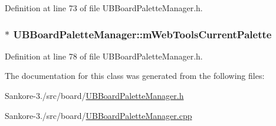 Definition at line 73 of file U\-B\-Board\-Palette\-Manager.\-h.

\hypertarget{class_u_b_board_palette_manager_a2e6478b9eff52e3d2681705a6db41a77}{
\subsubsection[{m\-Web\-Tools\-Current\-Palette}]{$\ast$ U\-B\-Board\-Palette\-Manager\-::m\-Web\-Tools\-Current\-Palette}}\label{dc/d38/class_u_b_board_palette_manager_a2e6478b9eff52e3d2681705a6db41a77}


Definition at line 78 of file U\-B\-Board\-Palette\-Manager.\-h.



The documentation for this class was generated from the following files\-:\begin{DoxyCompactItemize}
\item 
Sankore-\/3./src/board/\hyperlink{_u_b_board_palette_manager_8h}{U\-B\-Board\-Palette\-Manager.\-h}\item 
Sankore-\/3./src/board/\hyperlink{_u_b_board_palette_manager_8cpp}{U\-B\-Board\-Palette\-Manager.\-cpp}\end{DoxyCompactItemize}
